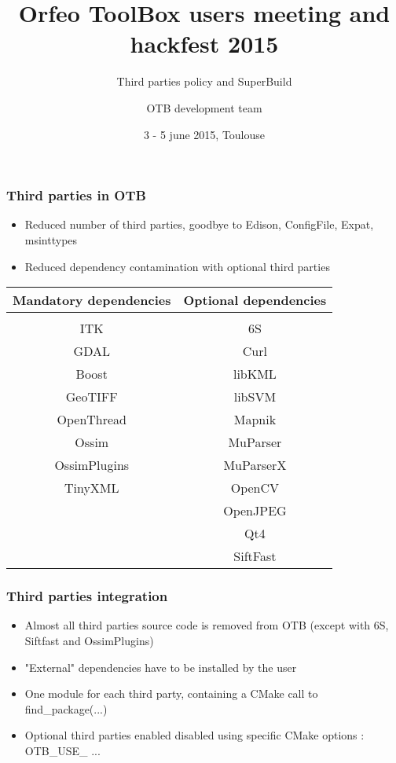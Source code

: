 \documentclass[8pt]{beamer}
\title{Orfeo ToolBox users meeting and hackfest 2015}
\subtitle{Third parties policy and SuperBuild}
\author{OTB development team}%
\date{3 - 5 june 2015, Toulouse}
\begin{document}
\begin{frame}
\titlepage
\end{frame}

\begin{frame}
\frametitle{Third parties in OTB}

\begin{itemize}
\item Reduced number of third parties, goodbye to Edison, ConfigFile, Expat, msinttypes
\item Reduced dependency contamination with optional third parties
\end{itemize}

\begin{center}
\begin{tabular}{c | c}
Mandatory dependencies & Optional dependencies \\
\hline \\
ITK & 6S \\
GDAL & Curl \\
Boost & libKML \\
GeoTIFF & libSVM \\
OpenThread & Mapnik \\
Ossim & MuParser \\
OssimPlugins & MuParserX \\
TinyXML & OpenCV \\
 & OpenJPEG \\
 & Qt4 \\
 & SiftFast \\
\end{tabular}
\end{center}

\end{frame}

\begin{frame}
\frametitle{Third parties integration}

\begin{itemize}
\item Almost all third parties source code is removed from OTB (except with 6S, Siftfast and OssimPlugins)
\item "External" dependencies have to be installed by the user
\item One module for each third party, containing a CMake call to find\_package(...)
\item Optional third parties enabled disabled using specific CMake options : OTB\_USE\_ ...
\end{itemize}

\end{frame}
\end{document}
